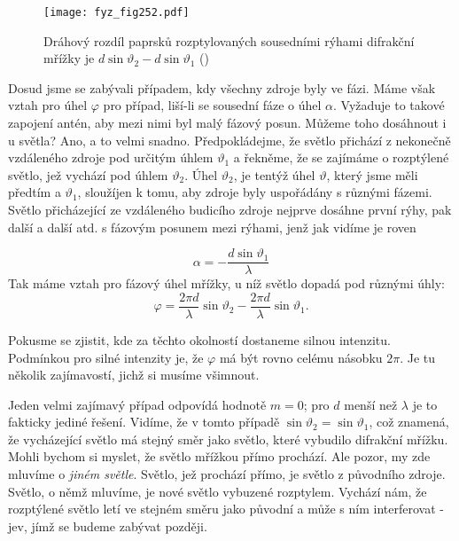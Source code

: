 {    \begin{figure}[ht!] %
      \centering
      \texttt{[image: fyz\_fig252.pdf]}
      \caption{Dráhový rozdíl paprsků rozptylovaných sousedními rýhami difrakční mřížky je 
               \(d\sin\vartheta_2 - d\sin\vartheta_1\)
               (\cite[s.~396]{Feynman01})}
      \label{fyz:fig252}
    \end{figure}
    
    Dosud jsme se zabývali případem, kdy všechny zdroje byly ve fázi. Máme však vztah pro úhel 
    \(\varphi\) pro případ, liší-li se sousední fáze o úhel \(\alpha\). Vyžaduje to takové zapojení 
    antén, aby mezi nimi byl malý fázový posun. Můžeme toho dosáhnout i u světla? Ano, a to velmi 
    snadno. Předpokládejme, že světlo přichází z nekonečně vzdáleného zdroje pod určitým úhlem 
    \(\vartheta_1\) a řekněme, že se zajímáme o rozptýlené světlo, jež vychází pod úhlem 
    \(\vartheta_2\). Úhel \(\vartheta_2\), je tentýž úhel \(\vartheta\), který jsme měli předtím 
    a \(\vartheta_1\), sloužíjen k tomu, aby zdroje byly uspořádány s různými fázemi. Světlo 
    přicházející ze vzdáleného budicího zdroje nejprve dosáhne první rýhy, pak další a další atd. s 
    fázovým posunem mezi rýhami, jenž jak vidíme je roven
    
    \begin{equation*}
      \alpha = - \frac{d\sin\vartheta_1}{\lambda}
    \end{equation*}
    Tak máme vztah pro fázový úhel mřížky, u níž světlo dopadá pod různými úhly:
    \begin{equation}\label{fyz:eq324}
      \varphi = \frac{2\pi d}{\lambda}\sin\vartheta_2 - 
                \frac{2\pi d}{\lambda}\sin\vartheta_1.               
    \end{equation}
    
    Pokusme se zjistit, kde za těchto okolností dostaneme silnou intenzitu. Podmínkou pro silné 
    intenzity je, že \(\varphi\) má být rovno celému násobku \(2\pi\). Je tu několik zajímavostí, 
    jichž si musíme všimnout.
    
    Jeden velmi zajímavý případ odpovídá hodnotě \(m = 0\); pro \(d\) menší než \(\lambda\) je to 
    fakticky jediné řešení. Vidíme, že v tomto případě \(\sin\vartheta_2 = \sin\vartheta_1\), což 
    znamená, že vycházející světlo má stejný směr jako světlo, které vybudilo difrakční mřížku. 
    Mohli bychom si myslet, že světlo mřížkou přímo prochází. Ale pozor, my zde mluvíme o 
    \emph{jiném světle}. Světlo, jež prochází přímo, je světlo z původního zdroje. Světlo, o němž 
    mluvíme, je nové světlo vybuzené rozptylem. Vychází nám, že rozptýlené světlo letí ve stejném 
    směru jako původní a může s ním interferovat - jev, jímž se budeme zabývat později.
    
}
